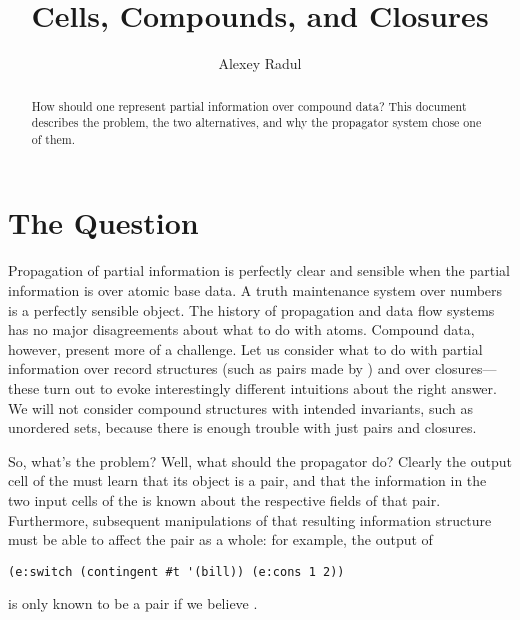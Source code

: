 \documentclass[12pt,letterpaper]{article}
\author{Alexey Radul}
\title{Cells, Compounds, and Closures}
\begin{document}
\maketitle

\begin{abstract}
How should one represent partial information over compound data?
This document describes the problem, the two alternatives, and why
the propagator system chose one of them.
\end{abstract}

\section{The Question}

Propagation of partial information is perfectly clear and sensible
when the partial information is over atomic base data.  A truth
maintenance system over numbers is a perfectly sensible object.  The
history of propagation and data flow systems has no major
disagreements about what to do with atoms.  Compound data, however,
present more of a challenge.  Let us consider what to do with partial
information over record structures (such as pairs made by )
and over closures---these turn out to evoke interestingly different
intuitions about the right answer.  We will not consider compound
structures with intended invariants, such as unordered sets, because
there is enough trouble with just pairs and closures.

So, what's the problem?  Well, what should the  propagator
do?  Clearly the output cell of the  must learn that its
object is a pair, and that the information in the two input cells of
the  is known about the respective fields of that pair.
Furthermore, subsequent manipulations of that resulting information
structure must be able to affect the pair as a whole: for example, the
output of
\begin{verbatim}
(e:switch (contingent #t '(bill)) (e:cons 1 2))
\end{verbatim}
is only known to be a pair if we believe .
\end{document}
